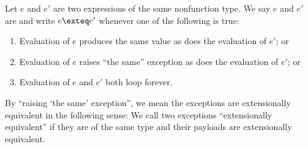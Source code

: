 \begin{node}\label{sml-0009}%
Let $e$ and $e'$ are two expressions of the same nonfunction type.
We say $e$ and $e'$ are  and write
$e\exteq e'$ whenever one of the following is true:
\begin{enumerate}
\item Evaluation of $e$ produces the same value as does the evaluation
  of $e'$; or
\item Evaluation of $e$ raises ``the same'' exception as does the evaluation
  of $e'$; or
\item Evaluation of $e$ and $e'$ both loop forever.
\end{enumerate}
By ``raising `the same' exception'', we mean the exceptions are
extensionally equivalent in the following sense:
We call two exceptions ``extensionally equivalent'' if they are of
the same type and their payloads are extensionally equivalent.
\end{node}
